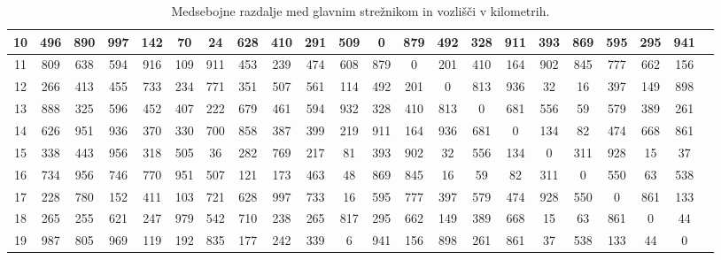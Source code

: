 \documentclass[a4paper, 12pt]{book}
\begin{document}
\begin{table}[h]
\begin{center}
\begin{tabulary}{1.0\textwidth}{
       | C | C | C | C | C | C | C | C | C | C | C | C | C | C | C | C | C | C | C | C | C | C |
    }
10 & 496 & 890 & 997 & 142 & 70 & 24 & 628 & 410 & 291 & 509 & 0 & 879 & 492 & 328 & 911 & 393 & 869 & 595 & 295 & 941 \\ \hline

11 & 809 & 638 & 594 & 916 & 109 & 911 & 453 & 239 & 474 & 608 & 879 & 0 & 201 & 410 & 164 & 902 & 845 & 777 & 662 & 156 \\ \hline

12 & 266 & 413 & 455 & 733 & 234 & 771 & 351 & 507 & 561 & 114 & 492 & 201 & 0 & 813 & 936 & 32 & 16 & 397 & 149 & 898 \\ \hline

13 & 888 & 325 & 596 & 452 & 407 & 222 & 679 & 461 & 594 & 932 & 328 & 410 & 813 & 0 & 681 & 556 & 59 & 579 & 389 & 261 \\ \hline

14 & 626 & 951 & 936 & 370 & 330 & 700 & 858 & 387 & 399 & 219 & 911 & 164 & 936 & 681 & 0 & 134 & 82 & 474 & 668 & 861 \\ \hline

15 & 338 & 443 & 956 & 318 & 505 & 36 & 282 & 769 & 217 & 81 & 393 & 902 & 32 & 556 & 134 & 0 & 311 & 928 & 15 & 37 \\ \hline

16 & 734 & 956 & 746 & 770 & 951 & 507 & 121 & 173 & 463 & 48 & 869 & 845 & 16 & 59 & 82 & 311 & 0 & 550 & 63 & 538 \\ \hline

17 & 228 & 780 & 152 & 411 & 103 & 721 & 628 & 997 & 733 & 16 & 595 & 777 & 397 & 579 & 474 & 928 & 550 & 0 & 861 & 133 \\ \hline

18 & 265 & 255 & 621 & 247 & 979 & 542 & 710 & 238 & 265 & 817 & 295 & 662 & 149 & 389 & 668 & 15 & 63 & 861 & 0 & 44 \\ \hline

19 & 987 & 805 & 969 & 119 & 192 & 835 & 177 & 242 & 339 & 6 & 941 & 156 & 898 & 261 & 861 & 37 & 538 & 133 & 44 & 0 \\ \hline

    \end{tabulary}
  \end{center}

  \caption{Medsebojne razdalje med glavnim strežnikom in vozlišči v \mbox{kilometrih}.}
  \label{tbl:sim_node_dist}
\end{table}
\end{document}
